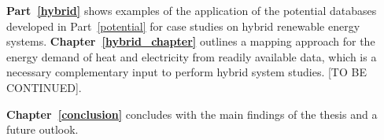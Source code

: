 \textbf{Part~\ref{hybrid}} shows examples of the application of the potential databases developed in Part~\ref{potential} for case studies on hybrid renewable energy systems. \textbf{Chapter~\ref{hybrid_chapter}} outlines a mapping approach for the energy demand of heat and electricity from readily available data, which is a necessary complementary input to perform hybrid system studies. [TO BE CONTINUED].

\textbf{Chapter~\ref{conclusion}} concludes with the main findings of the thesis and a future outlook.



